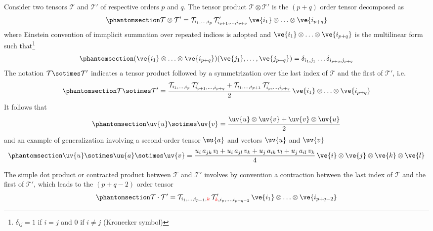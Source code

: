 \documentclass[
  letterpaper,
  DIV=11,
  numbers=noendperiod]{scrreprt}
\begin{document}
Consider two tensors \(\mathcal{T}\) and \(\mathcal{T}'\) of respective
orders \(p\) and \(q\). The tensor product
\(\mathcal{T}\otimes\mathcal{T}'\) is the \((p+q)\) order tensor
decomposed as \begin{equation}\phantomsection\label{eq-otimes}{
\mathcal{T}\otimes\mathcal{T}'=\mathcal{T}_{i_1,\ldots,i_p} \,\mathcal{T}'_{i_{p+1},\ldots,i_{p+q}}\,
\ve{i_1}\otimes\ldots\otimes\ve{i_{p+q}}
}\end{equation} where Einstein convention of immplicit summation over
repeated indices is adopted and
\(\ve{i_1}\otimes\ldots\otimes\ve{i_{p+q}}\) is the multilinear form
such that\footnote{\(\delta_{ij}=1\) if \(i=j\) and \(0\) if \(i\neq j\)
  (Kronecker symbol)} \begin{equation}\phantomsection\label{eq-multfom}{
(\ve{i_1}\otimes\ldots\otimes\ve{i_{p+q}})(\ve{j_1},\ldots,\ve{j_{p+q}})
=
\delta_{i_1,j_1}\ldots \delta_{i_{p+q},j_{p+q}}
}\end{equation} The notation \(\mathcal{T}\sotimes\mathcal{T}'\)
indicates a tensor product followed by a symmetrization over the last
index of \(\mathcal{T}\) and the first of \(\mathcal{T}'\), i.e.
\begin{equation}\phantomsection\label{eq-sotimes}{
\mathcal{T}\sotimes\mathcal{T}'=
\frac{\mathcal{T}_{i_1,\ldots,i_p} \,\mathcal{T}'_{i_{p+1},\ldots,i_{p+q}}
+
\mathcal{T}_{i_1,\ldots,i_{p+1}} \,\mathcal{T}'_{i_p,\ldots,i_{p+q}}
}{2}
\,\ve{i_1}\otimes\ldots\otimes\ve{i_{p+q}}
}\end{equation} It follows that
\begin{equation}\phantomsection\label{eq-sotimesuv}{
\uv{u}\sotimes\uv{v}=\frac{\uv{u}\otimes\uv{v}+\uv{v}\otimes\uv{u}}{2}
}\end{equation} and an example of generalization involving a
second-order tensor \(\uu{a}\) and vectors \(\uv{u}\) and \(\uv{v}\)
\begin{equation}\phantomsection\label{eq-sotimesuav}{
\uv{u}\sotimes\uu{a}\sotimes\uv{v}=
\frac{u_i\,a_{jk}\,v_l+u_i\,a_{jl}\,v_k+u_j\,a_{ik}\,v_l+u_j\,a_{il}\,v_k}{4}
\,\ve{i}\otimes\ve{j}\otimes\ve{k}\otimes\ve{l}
}\end{equation}

The simple dot product or contracted product between \(\mathcal{T}\) and
\(\mathcal{T}'\) involves by convention a contraction between the last
index of \(\mathcal{T}\) and the first of \(\mathcal{T}'\), which leads
to the \((p+q-2)\) order tensor
\begin{equation}\phantomsection\label{eq-simpledot}{
\mathcal{T}\cdot\mathcal{T}'=\mathcal{T}_{i_1,\ldots,i_{p-1},{\color{red}k}} \,\mathcal{T}'_{{\color{red}k},i_{p},\ldots,i_{p+q-2}}\,
\ve{i_1}\otimes\ldots\otimes\ve{i_{p+q-2}}
}\end{equation}
\end{document}
